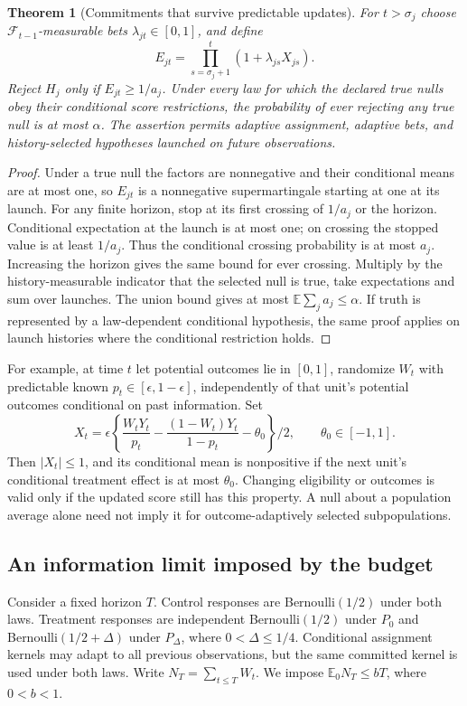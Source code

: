\documentclass[11pt,a4paper]{article}
\newtheorem{theorem}{Theorem}
\newcommand{\E}{\mathbb E}
\begin{document}
\begin{theorem}[Commitments that survive predictable updates]
For $t>\sigma_j$ choose $\mathcal F_{t-1}$-measurable bets $\lambda_{jt}\in[0,1]$, and define
\[
 E_{jt}=\prod_{s=\sigma_j+1}^{t}(1+\lambda_{js}X_{js}).
\]
Reject $H_j$ only if $E_{jt}\geq1/a_j$. Under every law for which the declared true nulls obey their conditional score restrictions, the probability of ever rejecting any true null is at most $\alpha$. The assertion permits adaptive assignment, adaptive bets, and history-selected hypotheses launched on future observations.
\end{theorem}
\begin{proof}
Under a true null the factors are nonnegative and their conditional means are at most one, so $E_{jt}$ is a nonnegative supermartingale starting at one at its launch. For any finite horizon, stop at its first crossing of $1/a_j$ or the horizon. Conditional expectation at the launch is at most one; on crossing the stopped value is at least $1/a_j$. Thus the conditional crossing probability is at most $a_j$. Increasing the horizon gives the same bound for ever crossing. Multiply by the history-measurable indicator that the selected null is true, take expectations and sum over launches. The union bound gives at most $\E\sum_j a_j\leq\alpha$. If truth is represented by a law-dependent conditional hypothesis, the same proof applies on launch histories where the conditional restriction holds.
\end{proof}

For example, at time $t$ let potential outcomes lie in $[0,1]$, randomize $W_t$ with predictable known $p_t\in[\epsilon,1-\epsilon]$, independently of that unit's potential outcomes conditional on past information. Set
\[
 X_t=\epsilon\left\{\frac{W_tY_t}{p_t}
               -\frac{(1-W_t)Y_t}{1-p_t}-\theta_0\right\}/2,
 \qquad \theta_0\in[-1,1].
\]
Then $|X_t|\leq1$, and its conditional mean is nonpositive if the next unit's conditional treatment effect is at most $\theta_0$. Changing eligibility or outcomes is valid only if the updated score still has this property. A null about a population average alone need not imply it for outcome-adaptively selected subpopulations.

\subsection*{An information limit imposed by the budget}
Consider a fixed horizon $T$. Control responses are Bernoulli$(1/2)$ under both laws. Treatment responses are independent Bernoulli$(1/2)$ under $P_0$ and Bernoulli$(1/2+\Delta)$ under $P_\Delta$, where $0<\Delta\leq1/4$. Conditional assignment kernels may adapt to all previous observations, but the same committed kernel is used under both laws. Write $N_T=\sum_{t\leq T}W_t$. We impose $\E_0N_T\leq bT$, where $0<b<1$.
\end{document}
